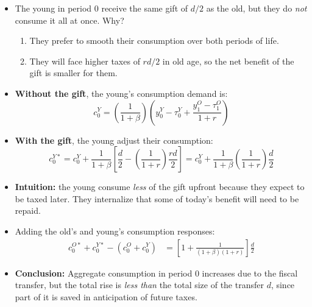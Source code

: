 \documentclass[12pt]{article}
\begin{document}
\begin{itemize}
  \item The young in period 0 receive the same gift of $d/2$ as the old, but they do \textit{not} consume it all at once. Why?
  \begin{enumerate}
    \item They prefer to smooth their consumption over both periods of life.
    \item They will face higher taxes of $rd/2$ in old age, so the net benefit of the gift is smaller for them.
  \end{enumerate}
  
  \item \textbf{Without the gift}, the young's consumption demand is:
  \[
  c_0^Y = \left( \frac{1}{1+\beta} \right) \left( y_0^Y - \tau_0^Y + \frac{y_1^O - \tau_1^O}{1+r} \right)
  \]
  
  \item \textbf{With the gift}, the young adjust their consumption:
  \[
  c_0^{Y*} = c_0^Y + \frac{1}{1+\beta} \left[ \frac{d}{2} - \left( \frac{1}{1+r} \right) \frac{rd}{2} \right]
  = c_0^Y + \frac{1}{1+\beta} \left( \frac{1}{1+r} \right) \frac{d}{2}
  \tag{26}
  \]
  
  \item \textbf{Intuition:} the young consume \textit{less} of the gift upfront because they expect to be taxed later. They internalize that some of today’s benefit will need to be repaid.

  \item Adding the old’s and young’s consumption responses:
  \begin{align*}
  c_0^{O*} + c_0^{Y*} - (c_0^O + c_0^Y)
  &= \left[ 1 + \frac{1}{(1+\beta)(1+r)} \right] \frac{d}{2}
  \end{align*}

  \item \textbf{Conclusion:} Aggregate consumption in period 0 increases due to the fiscal transfer, but the total rise is \textit{less than} the total size of the transfer $d$, since part of it is saved in anticipation of future taxes.
\end{itemize}
\end{document}
